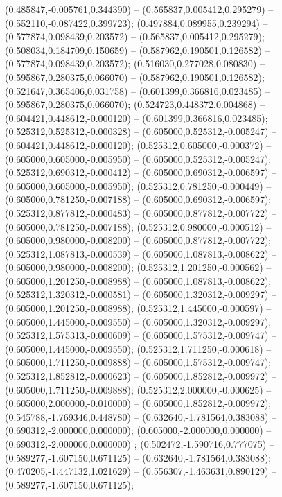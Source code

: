  (0.485847,-0.005761,0.344390) -- (0.565837,0.005412,0.295279) -- (0.552110,-0.087422,0.399723);
 (0.497884,0.089955,0.239294) -- (0.577874,0.098439,0.203572) -- (0.565837,0.005412,0.295279);
 (0.508034,0.184709,0.150659) -- (0.587962,0.190501,0.126582) -- (0.577874,0.098439,0.203572);
 (0.516030,0.277028,0.080830) -- (0.595867,0.280375,0.066070) -- (0.587962,0.190501,0.126582);
 (0.521647,0.365406,0.031758) -- (0.601399,0.366816,0.023485) -- (0.595867,0.280375,0.066070);
 (0.524723,0.448372,0.004868) -- (0.604421,0.448612,-0.000120) -- (0.601399,0.366816,0.023485);
 (0.525312,0.525312,-0.000328) -- (0.605000,0.525312,-0.005247) -- (0.604421,0.448612,-0.000120);
 (0.525312,0.605000,-0.000372) -- (0.605000,0.605000,-0.005950) -- (0.605000,0.525312,-0.005247);
 (0.525312,0.690312,-0.000412) -- (0.605000,0.690312,-0.006597) -- (0.605000,0.605000,-0.005950);
 (0.525312,0.781250,-0.000449) -- (0.605000,0.781250,-0.007188) -- (0.605000,0.690312,-0.006597);
 (0.525312,0.877812,-0.000483) -- (0.605000,0.877812,-0.007722) -- (0.605000,0.781250,-0.007188);
 (0.525312,0.980000,-0.000512) -- (0.605000,0.980000,-0.008200) -- (0.605000,0.877812,-0.007722);
 (0.525312,1.087813,-0.000539) -- (0.605000,1.087813,-0.008622) -- (0.605000,0.980000,-0.008200);
 (0.525312,1.201250,-0.000562) -- (0.605000,1.201250,-0.008988) -- (0.605000,1.087813,-0.008622);
 (0.525312,1.320312,-0.000581) -- (0.605000,1.320312,-0.009297) -- (0.605000,1.201250,-0.008988);
 (0.525312,1.445000,-0.000597) -- (0.605000,1.445000,-0.009550) -- (0.605000,1.320312,-0.009297);
 (0.525312,1.575313,-0.000609) -- (0.605000,1.575312,-0.009747) -- (0.605000,1.445000,-0.009550);
 (0.525312,1.711250,-0.000618) -- (0.605000,1.711250,-0.009888) -- (0.605000,1.575312,-0.009747);
 (0.525312,1.852812,-0.000623) -- (0.605000,1.852812,-0.009972) -- (0.605000,1.711250,-0.009888);
 (0.525312,2.000000,-0.000625) -- (0.605000,2.000000,-0.010000) -- (0.605000,1.852812,-0.009972);
 (0.545788,-1.769346,0.448780) -- (0.632640,-1.781564,0.383088) -- (0.690312,-2.000000,0.000000);
 (0.605000,-2.000000,0.000000) -- (0.690312,-2.000000,0.000000) ;
 (0.502472,-1.590716,0.777075) -- (0.589277,-1.607150,0.671125) -- (0.632640,-1.781564,0.383088);
 (0.470205,-1.447132,1.021629) -- (0.556307,-1.463631,0.890129) -- (0.589277,-1.607150,0.671125);
